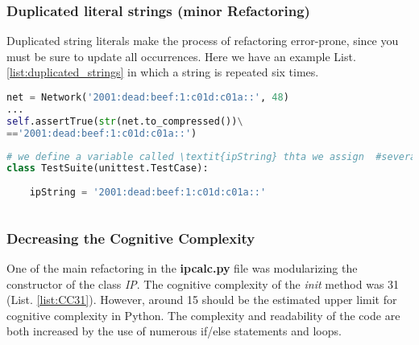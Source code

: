 \documentclass[unicode,11pt,a4paper,oneside,numbers=endperiod,openany]{scrartcl}
\begin{document}
\subsubsection{Duplicated literal strings (minor Refactoring)}
Duplicated string literals make the process of refactoring error-prone, since you must be sure to update all occurrences. Here we have an example List.  \ref{list:duplicated_strings} in which a string is repeated six times.
\begin{lstlisting}[language=Python, caption=Repeated strings before refactoring, label=list:duplicated_strings]
net = Network('2001:dead:beef:1:c01d:c01a::', 48)
...
self.assertTrue(str(net.to_compressed())\
=='2001:dead:beef:1:c01d:c01a::')
\end{lstlisting}

\begin{lstlisting}[language=Python, caption=Repeated strings after refactoring, label=list:duplicated\_strings\_ref]
# we define a variable called \textit{ipString} thta we assign  #several times
class TestSuite(unittest.TestCase):
    
    ipString = '2001:dead:beef:1:c01d:c01a::'
        
\end{lstlisting}




\subsubsection{Decreasing the Cognitive Complexity}
One of the main refactoring in the \textbf{ipcalc.py} file was modularizing the constructor of the class \textit{IP}. The cognitive complexity of the \textit{init} method was 31 (List. \ref{list:CC31}). However, around 15 should be the estimated upper limit for cognitive complexity in Python.
The complexity and readability of the code are both increased by the use of numerous if/else statements and loops.
\end{document}
